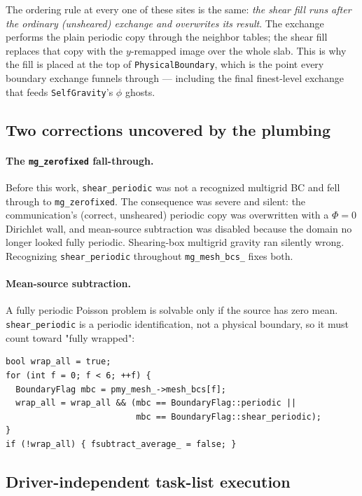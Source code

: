 \documentclass[11pt]{article}
\newcommand{\code}[1]{\texttt{#1}}
\newcommand{\fn}[1]{\texttt{\small #1}}
\begin{document}
\noindent
The ordering rule at every one of these sites is the same: \emph{the shear fill runs
after the ordinary (unsheared) exchange and overwrites its result}. The exchange
performs the plain periodic copy through the neighbor tables; the shear fill replaces
that copy with the $y$-remapped image over the whole slab. This is why the fill is
placed at the top of \fn{PhysicalBoundary}, which is the point every boundary
exchange funnels through --- including the final finest-level exchange that feeds
\code{SelfGravity}'s $\phi$ ghosts.

\subsection{Two corrections uncovered by the plumbing}

\paragraph{The \code{mg\_zerofixed} fall-through.} Before this work,
\code{shear\_periodic} was not a recognized multigrid BC and fell through to
\code{mg\_zerofixed}. The consequence was severe and silent: the communication's
(correct, unsheared) periodic copy was overwritten with a $\Phi = 0$ Dirichlet wall,
and mean-source subtraction was disabled because the domain no longer looked fully
periodic. Shearing-box multigrid gravity ran silently wrong. Recognizing
\code{shear\_periodic} throughout \code{mg\_mesh\_bcs\_} fixes both.

\paragraph{Mean-source subtraction.} A fully periodic Poisson problem is solvable only
if the source has zero mean. \code{shear\_periodic} is a periodic identification, not
a physical boundary, so it must count toward "fully wrapped":

\begin{lstlisting}
bool wrap_all = true;
for (int f = 0; f < 6; ++f) {
  BoundaryFlag mbc = pmy_mesh_->mesh_bcs[f];
  wrap_all = wrap_all && (mbc == BoundaryFlag::periodic ||
                          mbc == BoundaryFlag::shear_periodic);
}
if (!wrap_all) { fsubtract_average_ = false; }
\end{lstlisting}

\subsection{Driver-independent task-list execution}
\end{document}
